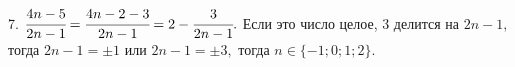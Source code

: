 7. $\cfrac{4n-5}{2n-1}=\cfrac{4n-2-3}{2n-1}=2-\cfrac{3}{2n-1}.$ Если это число целое, 3 делится на $2n-1,$ тогда $2n-1=\pm1$ или $2n-1=\pm3,$ тогда
$n\in\{-1; 0; 1; 2\}.$\\
